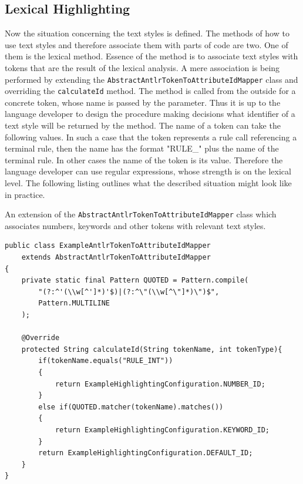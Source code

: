 \documentclass[12pt,notitlepage,a4paper]{report}
\begin{document}
\subsection {Lexical Highlighting}
\label{LexicalHighlighting}
Now the situation concerning the text styles is defined. The methods of how to use text styles and therefore associate them with parts of code are two. One of them is the lexical method. Essence of the method is to associate text styles with tokens that are the result of the lexical analysis. A mere association is being performed by extending the \texttt{AbstractAntlrTokenToAttributeIdMapper} class and overriding the \texttt{calculateId} method. The method is called from the outside for a concrete token, whose name is passed by the parameter. Thus it is up to the language developer to design the procedure making decisions what identifier of a text style will be returned by the method. The name of a token can take the following values. In such a case that the token represents a rule call referencing a terminal rule, then the name has the format "RULE\_" plus the name of the terminal rule. In other cases the name of the token is its value. Therefore the language developer can use regular expressions, whose strength is on the lexical level. The following listing outlines what the described situation might look like in practice.
\begin{expl} \label{LexicalHighlightingExample}
An extension of the \texttt{AbstractAntlrTokenToAttributeIdMapper} class which associates numbers, keywords and other tokens with relevant text styles.
\begingroup
\fontsize{10pt}{12pt}
\begin{verbatim}
public class ExampleAntlrTokenToAttributeIdMapper
    extends AbstractAntlrTokenToAttributeIdMapper
{
    private static final Pattern QUOTED = Pattern.compile(
        "(?:^'(\\w[^']*)'$)|(?:^\"(\\w[^\"]*)\")$",
        Pattern.MULTILINE
    );
	
    @Override
    protected String calculateId(String tokenName, int tokenType){
        if(tokenName.equals("RULE_INT"))
        {
            return ExampleHighlightingConfiguration.NUMBER_ID;
        }
        else if(QUOTED.matcher(tokenName).matches())
        {
            return ExampleHighlightingConfiguration.KEYWORD_ID;
        }
        return ExampleHighlightingConfiguration.DEFAULT_ID;
    }
}
\end{verbatim}
\endgroup
\end{expl}
\end{document}
